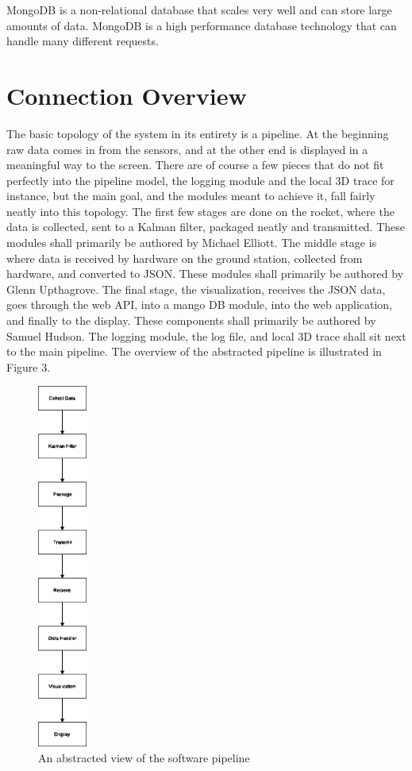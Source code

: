 \documentclass[onecolumn, draftclsnofoot,10pt, compsoc]{IEEEtran}
\begin{document}
MongoDB is a non-relational database that scales very well and can store large amounts of data. MongoDB is a high performance database technology that can handle many different requests.
\section {Connection Overview} 
The basic topology of the system in its entirety is a pipeline. At the beginning raw data comes in from the sensors, and at the other end is displayed in a meaningful way to the screen. There are of course a few pieces that do not fit perfectly into the pipeline model, the logging module and the local 3D trace for instance, but the main goal, and the modules meant to achieve it, fall fairly neatly into this topology. The first few stages are done on the rocket, where the data is collected, sent to a Kalman filter, packaged neatly and transmitted. These modules shall primarily be authored by Michael Elliott. The middle stage is where data is received by hardware on the ground station, collected from hardware, and converted to JSON. These modules shall primarily be authored by Glenn Upthagrove. The final stage, the visualization, receives the JSON data, goes through the web API, into a mango DB module, into the web application, and finally to the display. These components shall primarily be authored by Samuel Hudson. The logging module, the log file, and local 3D trace shall sit next to the main pipeline. The overview of the abstracted pipeline is illustrated in Figure 3. 
\begin{figure}[h]
    \centering
        \includegraphics[height=12cm]{basicpipeline}
        \caption{An abstracted view of the software pipeline}
        \label{fig:handel}
\end{figure}
\end{document}
